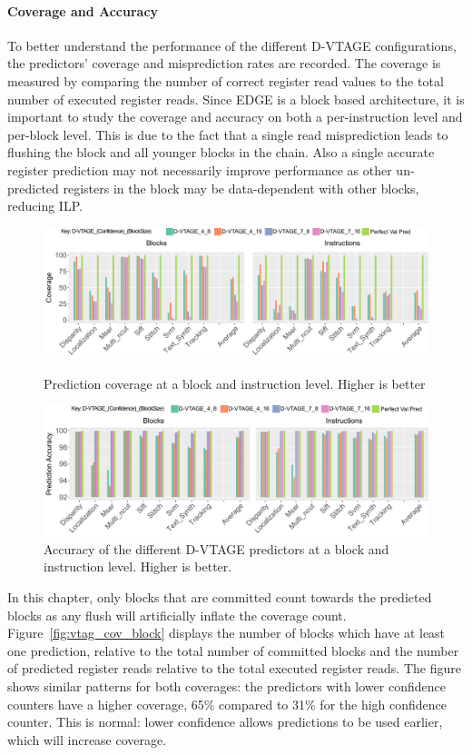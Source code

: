 \paragraph*{Coverage and Accuracy}
To better understand the performance of the different D-VTAGE configurations, the predictors' coverage and misprediction rates are recorded.
The coverage is measured by comparing the number of correct register read values to the total number of executed register reads.
Since EDGE is a block based architecture, it is important to study the coverage and accuracy on both a per-instruction level and per-block level.
This is due to the fact that a single read misprediction leads to flushing the block and all younger blocks in the chain.
Also a single accurate register prediction may not necessarily improve performance as other un-predicted registers in the block may be data-dependent with other blocks, reducing ILP.

\begin{figure}[t]
    \centering
    \includegraphics[width=1\textwidth]{chapter3/graphics/coverageFull2.pdf}
    \caption{Prediction coverage at a block and instruction level. Higher is better}
    \label{fig:vtag_cov_block}
	\vspace{1em}
    \centering
    \includegraphics[width=1\textwidth]{chapter3/graphics/predAcc2.pdf}
    \caption{Accuracy of the different D-VTAGE predictors at a block and instruction level. Higher is better.}
    \label{fig:vtag_accuracy_block}
	\vspace{1em}
\end{figure}
In this chapter, only blocks that are committed count towards the predicted blocks as any flush will artificially inflate the coverage count.
Figure~\ref{fig:vtag_cov_block} displays the number of blocks which have at least one prediction, relative to the total number of committed blocks and the number of predicted register reads relative to the total executed register reads.
The figure shows similar patterns for both coverages: the predictors with lower confidence counters have a higher coverage, 65\% compared to 31\% for the high confidence counter.
This is normal: lower confidence allows predictions to be used earlier, which will increase coverage.

